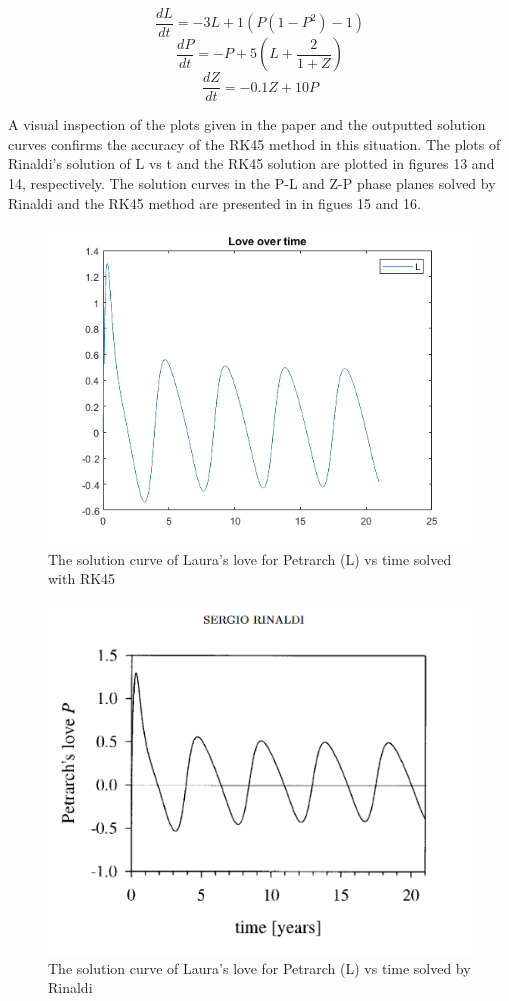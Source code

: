 \documentclass[11pt]{article}
\begin{document}
$$\frac{dL}{dt}=-3L+1(P(1-P^{2})-1)$$
$$\frac{dP}{dt}=-P+5(L+\frac{2}{1+Z})$$
$$\frac{dZ}{dt}=-0.1Z+10P$$

A visual inspection of the plots given in the paper and the outputted solution 
curves confirms the accuracy of the RK45 method in this situation. The plots of
Rinaldi's solution  of L vs t and the RK45 solution are plotted in figures 13
and 14, respectively. The solution curves in the P-L and Z-P phase planes
solved by Rinaldi and the RK45 method are presented in in figues 15 and 16.

\begin{figure} [!h]
\centering
        \includegraphics[totalheight=8cm]{evol1.png}
    \caption{The solution curve of Laura's love for Petrarch (L) vs time solved with RK45}
    \label{figure13}
\end{figure}

\newpage

\begin{figure} [!h]
\centering
        \includegraphics[totalheight=6.5cm]{sergio.png}
    \caption{The solution curve of Laura's love for Petrarch (L) vs time solved by Rinaldi}
    \label{figure14}
\end{figure}
\end{document}
